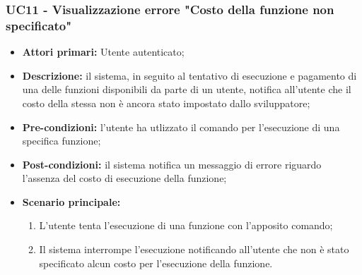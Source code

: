 \subsubsection{UC11 - Visualizzazione errore "Costo della funzione non specificato"}
\begin{itemize}
	\item \textbf{Attori primari:} Utente autenticato;
	\item \textbf{Descrizione:} il sistema, in seguito al tentativo di esecuzione e pagamento di una delle funzioni disponibili da parte di un utente, notifica all'utente che il costo della stessa non è ancora stato impostato dallo sviluppatore; 
	\item \textbf{Pre-condizioni:} l'utente ha utlizzato il comando per l'esecuzione di una specifica funzione;
	\item \textbf{Post-condizioni:} il sistema notifica un messaggio di errore riguardo l'assenza del costo di esecuzione della funzione;
	\item \textbf{Scenario principale:} 
	\begin{enumerate}
		\item L'utente tenta l'esecuzione di una funzione con l'apposito comando;
		\item Il sistema interrompe l'esecuzione notificando all'utente che non è stato specificato alcun costo per l'esecuzione della funzione.
	\end{enumerate}
\end{itemize}